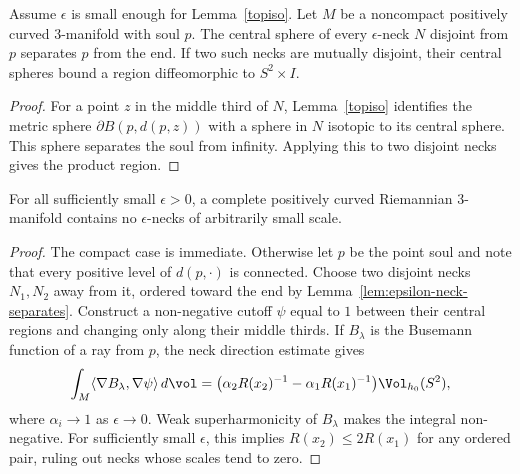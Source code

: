 \begin{lemma}
\label{lem:epsilon-neck-separates}
\label{neckseparate}

Assume $\epsilon$ is small enough for Lemma~\ref{topiso}. Let $M$ be a
noncompact positively curved $3$-manifold with soul $p$. The central
sphere of every $\epsilon$-neck $N$ disjoint from $p$ separates $p$
from the end. If two such necks are mutually disjoint, their central
spheres bound a region diffeomorphic to $S^2\times I$.
\end{lemma}
\begin{proof}
\sketch
{}
For a point $z$ in the middle third of $N$, Lemma~\ref{topiso}
identifies the metric sphere $\partial B(p,d(p,z))$ with a sphere in
$N$ isotopic to its central sphere. This sphere separates the soul from
infinity. Applying this to two disjoint necks gives the product region.
\end{proof}

\begin{proposition}
\label{prop:epsilon-neck-narrow}
\label{narrows}

For all sufficiently small $\epsilon>0$, a complete positively curved
Riemannian $3$-manifold contains no $\epsilon$-necks of arbitrarily
small scale.
\end{proposition}
\begin{proof}
\sketch

The compact case is immediate. Otherwise let $p$ be the point soul and
note that every positive level of $d(p,\cdot)$ is connected. Choose two
disjoint necks $N_1,N_2$ away from it, ordered toward the
end by Lemma~\ref{lem:epsilon-neck-separates}. Construct a non-negative
cutoff $\psi$ equal to $1$ between their central regions and changing
only along their middle thirds. If $B_\lambda$ is the Busemann function
of a ray from $p$, the neck direction estimate gives
$$\int_M\langle\nabla B_\lambda,\nabla\psi\rangle\,d\vol
=\bigl(\alpha_2R(x_2)^{-1}-\alpha_1R(x_1)^{-1}\bigr)
\Vol_{h_0}(S^2),$$
where $\alpha_i\to1$ as $\epsilon\to0$. Weak superharmonicity of
$B_\lambda$ makes the integral non-negative. For sufficiently small
$\epsilon$, this implies $R(x_2)\le2R(x_1)$ for any ordered pair, ruling
out necks whose scales tend to zero.
\end{proof}

